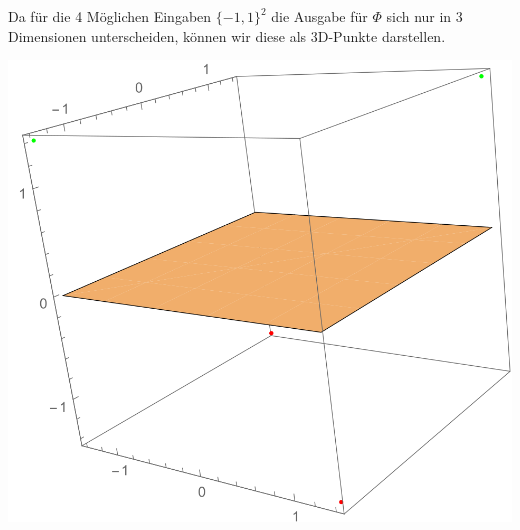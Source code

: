 \documentclass[a4paper,parskip=full-]{article}
\begin{document}
Da für die 4 Möglichen Eingaben $\{-1,1\}^2$ die Ausgabe für $\Phi$ sich nur in 3 Dimensionen unterscheiden, können wir diese als 3D-Punkte darstellen. 

\includegraphics[scale=1]{3c}
%
\end{document}
